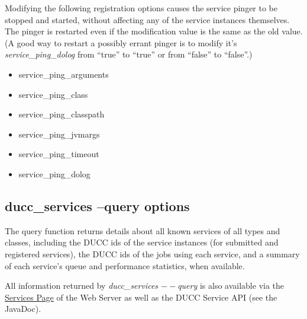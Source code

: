     Modifying the following registration options causes the service pinger to be stopped and
    started, without affecting any of the service instances themselves.  The pinger is restarted
    even if the modification value is the same as the old value. (A good way to restart
    a possibly errant pinger is to modify it's {\em service\_ping\_dolog} from ``true'' to ``true'' or
    from ``false'' to ``false''.)
    \begin{itemize}
      \item service\_ping\_arguments
      \item service\_ping\_class
      \item service\_ping\_classpath
      \item service\_ping\_jvmargs
      \item service\_ping\_timeout
      \item service\_ping\_dolog
    \end{itemize}
    
    \subsection{ducc\_services --query options}
    The query function returns details about all known services of all types and classes, including 
    the DUCC ids of the service instances (for submitted and registered services), the DUCC ids of 
    the jobs using each service, and a summary of each service's queue and performance statistics, 
    when available. 
    
    All information returned by {\em ducc\_services $--$query} is also available via the
    \hyperref[ws:services-page]{Services Page} of the Web Server as well as the DUCC Service API (see 
    the JavaDoc).

